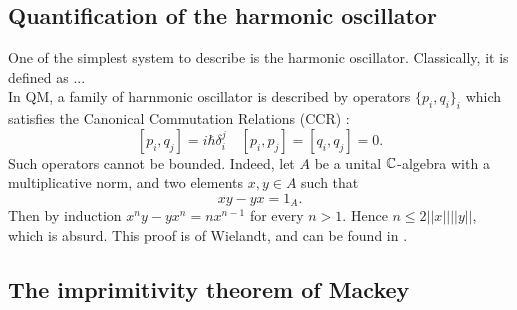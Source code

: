 \subsection{Quantification of the harmonic oscillator}

One of the simplest system to describe is the harmonic oscillator. Classically, it is defined as ...\\

In QM, a family of harnmonic oscillator is described by operators $\{p_i , q_i\}_i$ which satisfies the Canonical Commutation Relations (CCR) :
\[[p_i,q_j ] = i\hbar \delta_i^j \quad [p_i,p_j]=[q_i,q_j]=0.\]
Such operators cannot be bounded. Indeed, let $A$ be a unital $\mathbb C$-algebra with a multiplicative norm, and two elements $x,y\in A$ such that
\[xy-yx = 1_A.\]
Then by induction $x^ny-yx^n = nx^{n-1}$ for every $n>1$. Hence $n \leq 2 || x || || y||$, which is absurd. This proof is of Wielandt, and can be found in \cite{Rudin}.



\subsection{The imprimitivity theorem of Mackey}